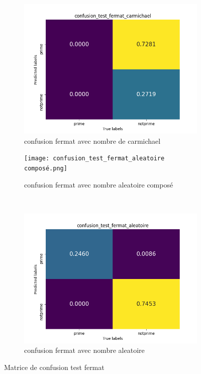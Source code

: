 \documentclass{article}
\begin{document}
\begin{figure}[H]
\begin{subfigure}{.5\linewidth}
\centering
\includegraphics[scale=0.45]{confusion_test_fermat_carmichael.png}
\caption{\centering confusion fermat avec nombre de carmichael}
\label{fig:sub1}
\end{subfigure}%
\begin{subfigure}{.5\linewidth}
\centering
\texttt{[image: confusion\_test\_fermat\_aleatoire composé.png]}
\caption{\centering confusion fermat avec nombre aleatoire composé}
\label{fig:sub2}
\end{subfigure}\\[1ex]
\begin{subfigure}{\linewidth}
\centering
\includegraphics[scale=0.45]{confusion_test_fermat_aleatoire.png}
\caption{\centering confusion fermat avec nombre aleatoire}
\label{fig:sub3}
\end{subfigure}
\caption{\centering Matrice de confusion test fermat}
\label{fig:test}
\end{figure}
\end{document}
